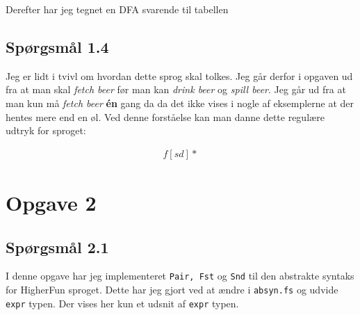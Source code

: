 \documentclass[danish,a4paper]{report}
\begin{document}
Derefter har jeg tegnet en DFA svarende til tabellen

\begin{center}
\end{center}
\section*{Spørgsmål 1.4}

Jeg er lidt i tvivl om hvordan dette sprog skal tolkes. Jeg går derfor i opgaven ud fra at man skal \textit{fetch beer} før man kan \textit{drink beer} og \textit{spill beer}. Jeg går ud fra at man kun må \textit{fetch beer} \textbf{én} gang da da det ikke vises i nogle af eksemplerne at der hentes mere end en øl. Ved denne forståelse kan man danne dette regulære udtryk for sproget:

\begin{align*}
f[sd]*
\end{align*}

\chapter*{Opgave 2}
\section*{Spørgsmål 2.1}

I denne opgave har jeg implementeret \texttt{Pair, Fst} og \texttt{Snd} til den abstrakte syntaks for HigherFun sproget. Dette har jeg gjort ved at ændre i \texttt{absyn.fs} og udvide \texttt{expr} typen. Der vises her kun et udsnit af \texttt{expr} typen.
\end{document}
